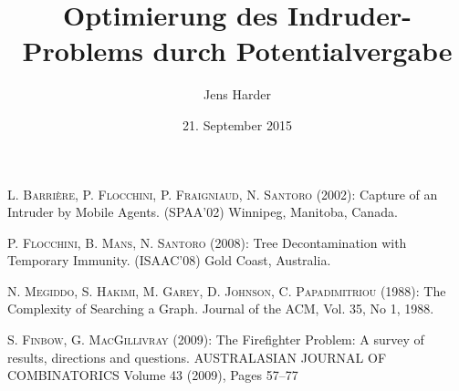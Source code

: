\documentclass[12pt, a4paper, german]{article}
\author{Jens Harder}
\date{21. September 2015}
\title{Optimierung des Indruder-Problems durch Potentialvergabe}
\begin{document}
	\maketitle
	\newpage
	
	\doublespacing
	\tableofcontents
	
	\newpage
	
	
	
	
	

	
	
	
	
	
	
	\newpage

	\renewcommand{\refname}{Literaturquellen}
	
	\begin{thebibliography}{99}
		
		
		 \textsc{L. Barrière, P. Flocchini, P. Fraigniaud, N. Santoro} (2002): Capture of an Intruder by Mobile Agents. (SPAA'02) Winnipeg, Manitoba, Canada.

		 \textsc{P. Flocchini, B. Mans, N. Santoro} (2008): Tree Decontamination with Temporary Immunity. (ISAAC'08) Gold Coast, Australia.
		
		 \textsc{N. Megiddo, S. Hakimi, M. Garey, D. Johnson, C. Papadimitriou} (1988): The Complexity of Searching a Graph. Journal of the ACM, Vol. 35, No 1, 1988.
		
		 \textsc{S. Finbow, G. MacGillivray} (2009): The Firefighter Problem: A survey of results, directions and questions.
		AUSTRALASIAN JOURNAL OF COMBINATORICS Volume 43 (2009), Pages 57–77

		
	\end{thebibliography} 
	
	
	
	
\end{document}
